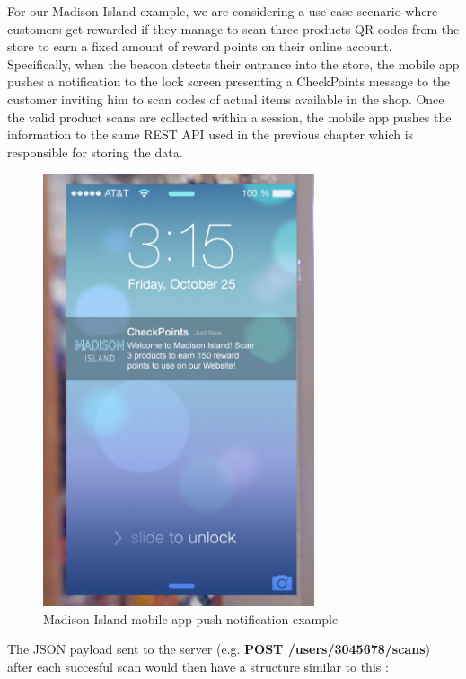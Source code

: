 For our Madison Island example, we are considering a use case scenario where customers get rewarded if they manage to scan three products QR codes from the store to earn a fixed amount of reward points on their online account. Specifically, when the beacon detects their entrance into the store, the mobile app pushes a notification to the lock screen presenting a CheckPoints message to the customer inviting him to scan codes of actual items available in the shop. Once the valid product scans are collected within a session, the mobile app pushes the information to the same REST API used in the previous chapter which is responsible for storing the data.

\vspace{0.5cm}
\begin{figure}[H]
  \centering
    \includegraphics[width=8cm]{images/madison-push-reward-points.jpg}
  \caption{Madison Island mobile app push notification example}
  \label{fig:mobile-app-push-notification}
\end{figure}
\vspace{0.5cm}


The JSON payload sent to the server (e.g. \textbf{POST /users/3045678/scans}) after each succesful scan would then have a structure similar to this :

